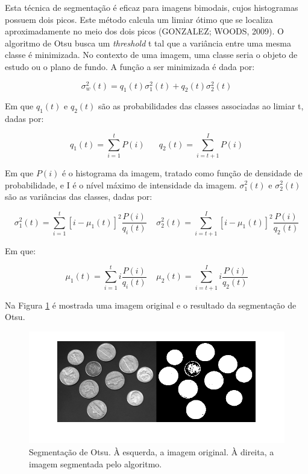 Esta técnica de segmentação é eficaz para imagens bimodais, cujos histogramas possuem dois picos. Este método calcula um limiar ótimo que se localiza aproximadamente no meio dos dois picos (GONZALEZ; WOODS, 2009). O algoritmo de Otsu busca um \textit{threshold} t tal que a variância entre uma mesma classe é minimizada. No contexto de uma imagem, uma classe seria o objeto de estudo ou o plano de fundo. A função a ser minimizada é dada por:

\begin{equation} \label{eq:otsu}
	\sigma_w^2(t) = q_1(t)\sigma_1^2(t) + q_2(t)\sigma_2^2(t)
\end{equation}

Em que $q_1(t)$ e $q_2(t)$ são as probabilidades das classes associadas ao limiar t, dadas por:

\begin{equation}
	q_1(t) = \sum_{i=1}^t{P(i)} \;\;\;\;\;\; q_2(t) = \sum_{i=t+1}^I{P(i)}
\end{equation}

Em que $P(i)$ é o histograma da imagem, tratado como função de densidade de probabilidade, e I é o nível máximo de intensidade da imagem. $\sigma_1^2(t)$ e $\sigma_2^2(t)$ são as variâncias das classes, dadas por:

\begin{equation}
	\sigma_1^2(t) = \sum_{i=1}^t{[i-\mu_1(t)]^2\frac{P(i)}{q_i(t)}} \;\;\;\; \sigma_2^2(t) = \sum_{i=t+1}^I{[i-\mu_1(t)]^2\frac{P(i)}{q_2(t)}}
\end{equation}

Em que:

\begin{equation}
	\mu_1(t) = \sum_{i=1}^t{i\frac{P(i)}{q_i(t)}} \;\;\;\; \mu_2(t) = \sum_{i=t+1}^I{i\frac{P(i)}{q_2(t)}}
\end{equation}

Na Figura \ref{img:otsu} é mostrada uma imagem original e o resultado da segmentação de Otsu.

\begin{figure}[H]
\centering
    \caption{\label{img:otsu} Segmentação de Otsu. À esquerda, a imagem original. À direita, a imagem segmentada pelo algoritmo.}
    \includegraphics[scale=0.5]{img/otsu.png}
\end{figure}


